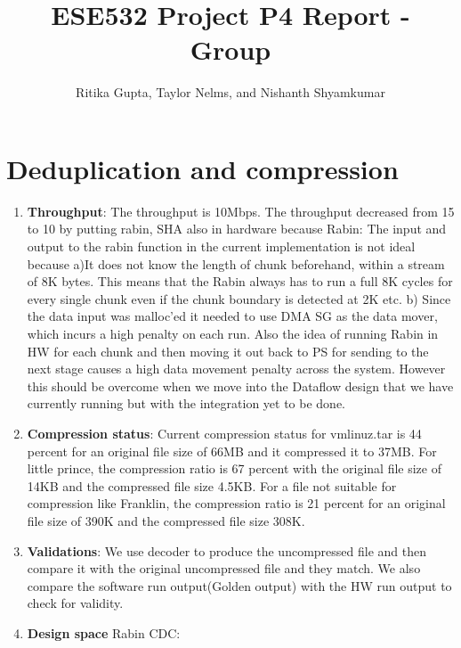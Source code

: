 \documentclass{article}
\title{ESE532 Project P4 Report - Group}
\author{Ritika Gupta, Taylor Nelms, and Nishanth Shyamkumar}
\begin{document}
\maketitle


\section{Deduplication and compression}
\begin{enumerate}
\item%
\textbf{Throughput}: The throughput is 10Mbps. The throughput decreased from 15 to 10 by putting rabin, SHA also in hardware because 
Rabin: The input and output to the rabin function in the current implementation is not ideal because 
a)It does not know the length of chunk beforehand, within a stream of 8K bytes. This means that the Rabin always has to run a full 8K cycles for every single chunk even if the chunk boundary is detected at 2K etc.
b) Since the data input was malloc'ed it needed to use DMA SG as the data mover, which incurs a high penalty on each run. Also the idea of running Rabin in HW for each chunk and then moving it out back to PS for sending to the next stage causes a high data movement penalty across the system. However this should be overcome when we move into the Dataflow design that we have currently running but with the integration yet to be done. 

\newline

\item%
\textbf{Compression status}: Current compression status for vmlinuz.tar is 44 percent for an original file size of 66MB and it compressed it to 37MB. For little prince, the compression ratio is 67 percent with the original file size of 14KB and the compressed file size 4.5KB. For a file not suitable for compression like Franklin, the compression ratio is 21 percent for an original file size of 390K and the compressed file size 308K.
\newline

\item%
\textbf{Validations}: We use decoder to produce the uncompressed file and then compare it with the original uncompressed file and they match. 
We also compare the software run output(Golden output) with the HW run output to check for validity. 
\newline

\item%
\textbf{Design space}
Rabin CDC:


\end{enumerate}
\end{document}
